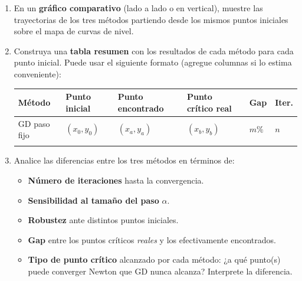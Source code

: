 \documentclass[12pt,a4paper]{article}
\begin{document}
\begin{enumerate}[label=\alph*), leftmargin=*, topsep=2pt]
    \item En un \textbf{gráfico comparativo} (lado a lado o en vertical),
          muestre las trayectorias de los tres métodos partiendo desde los
          mismos puntos iniciales sobre el mapa de curvas de nivel.
    \item Construya una \textbf{tabla resumen} con los resultados de cada
          método para cada punto inicial. Puede usar el siguiente formato
          (agregue columnas si lo estima conveniente):

          \begin{center}
          \small
          \renewcommand{\arraystretch}{1.3}
          \begin{tabular}{@{}
              >{\raggedright\arraybackslash}p{2.2cm}
              >{\centering\arraybackslash}p{1.7cm}
              >{\centering\arraybackslash}p{2.0cm}
              >{\centering\arraybackslash}p{2.0cm}
              >{\centering\arraybackslash}p{1.0cm}
              >{\centering\arraybackslash}p{1.6cm}@{}}
          \toprule
          \textbf{Método} &
          \textbf{Punto inicial} &
          \textbf{Punto encontrado} &
          \textbf{Punto crítico real} &
          \textbf{Gap} &
          \textbf{Iter.} \\
          \midrule
          GD paso fijo & $(x_0,y_0)$ & $(x_a,y_a)$ & $(x_b,y_b)$ & $m\%$ & $n$ \\
          \multicolumn{6}{c}{\dots} \\
          \bottomrule
          \end{tabular}
          \end{center}

    \item Analice las diferencias entre los tres métodos en términos de:
          \begin{itemize}[topsep=2pt]
              \item \textbf{Número de iteraciones} hasta la convergencia.
              \item \textbf{Sensibilidad al tamaño del paso} $\alpha$.
              \item \textbf{Robustez} ante distintos puntos iniciales.
              \item \textbf{Gap} entre los puntos críticos \emph{reales} y los
                    efectivamente encontrados.
              \item \textbf{Tipo de punto crítico} alcanzado por cada método:
                    ¿a qué punto(s) puede converger Newton que GD nunca
                    alcanza? Interprete la diferencia.
          \end{itemize}
\end{enumerate}
\end{document}
